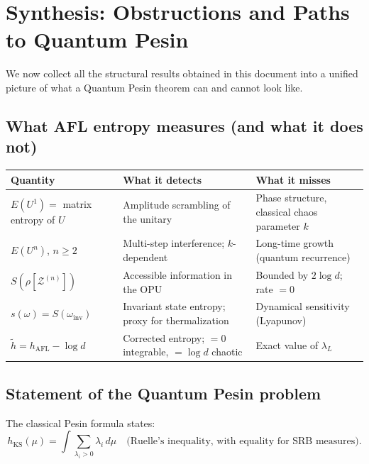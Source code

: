 \documentclass[12pt,a4paper]{article}
\begin{document}
\section{Synthesis: Obstructions and Paths to Quantum Pesin}
\label{sec:pesin_synthesis}

We now collect all the structural results obtained in this document into a
unified picture of what a Quantum Pesin theorem can and cannot look like.

\subsection{What AFL entropy measures (and what it does not)}

\begin{table}[h]\centering
\begin{tabular}{p{4.5cm}p{4.5cm}p{4.5cm}}
\hline
\textbf{Quantity} & \textbf{What it detects} & \textbf{What it misses} \\
\hline
$E(U^1) = $ matrix entropy of $U$ &
Amplitude scrambling of the unitary &
Phase structure, classical chaos parameter $k$ \\
$E(U^n)$, $n\geq 2$ &
Multi-step interference; $k$-dependent &
Long-time growth (quantum recurrence) \\
$S(\rho[\mathcal{Z}^{(n)}])$ &
Accessible information in the OPU &
Bounded by $2\log d$; rate $=0$ \\
$s(\omega) = S(\omega_{\mathrm{inv}})$ &
Invariant state entropy; proxy for thermalization &
Dynamical sensitivity (Lyapunov) \\
$\tilde{h} = h_{\mathrm{AFL}}-\log d$ &
Corrected entropy; $=0$ integrable, $=\log d$ chaotic &
Exact value of $\lambda_L$ \\
\hline
\end{tabular}
\end{table}

\subsection{Statement of the Quantum Pesin problem}

The classical Pesin formula states:
\begin{equation}\label{eq:classical_pesin}
  h_{\mathrm{KS}}(\mu) = \int \sum_{\lambda_i > 0}\lambda_i\,d\mu
  \quad\text{(Ruelle's inequality, with equality for SRB measures)}.
\end{equation}
\end{document}
